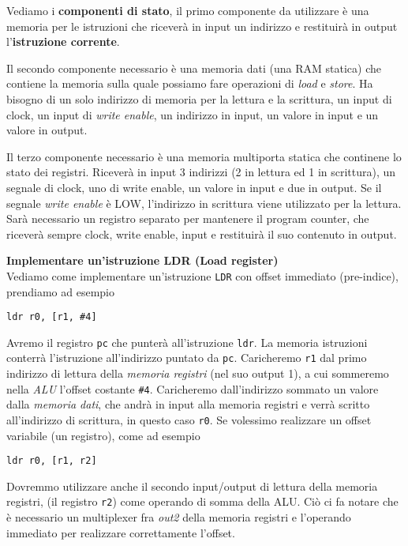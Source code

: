 Vediamo i \textbf{componenti di stato}, il primo componente da utilizzare è una memoria per le istruzioni che riceverà in input
un indirizzo e restituirà in output l'\textbf{istruzione corrente}.

Il secondo componente necessario è una memoria dati (una RAM statica) che contiene la memoria sulla quale possiamo fare operazioni di \textit{load} e \textit{store}.
Ha bisogno di un solo indirizzo di memoria per la lettura e la scrittura, un input di clock, un input di \textit{write enable}, un indirizzo in input, un valore in input e un valore in output.

Il terzo componente necessario è una memoria multiporta statica che continene lo stato dei registri.
Riceverà in input 3 indirizzi (2 in lettura ed 1 in scrittura), un segnale di clock, uno di write enable, un valore in input e due in output.
Se il segnale \textit{write enable} è LOW, l'indirizzo in scrittura viene utilizzato per la lettura.
Sarà necessario un registro separato per mantenere il program counter, che riceverà sempre clock, write enable, input e restituirà il suo contenuto in output.


\begin{defn}
\textbf{Implementare un'istruzione LDR (Load register)} \\
Vediamo come implementare un'istruzione \verb|LDR| con offset immediato (pre-indice), prendiamo ad esempio
\begin{lstlisting}[style=arm]
ldr r0, [r1, #4]
\end{lstlisting}
Avremo il registro \verb|pc| che punterà all'istruzione \verb|ldr|. La memoria istruzioni conterrà l'istruzione all'indirizzo puntato da \verb|pc|.
Caricheremo \verb|r1| dal primo indirizzo di lettura della \textit{memoria registri} (nel suo output 1), a cui sommeremo  nella \textit{ALU} l'offset costante \verb|#4|.
Caricheremo dall'indirizzo sommato un valore dalla \textit{memoria dati}, che andrà in input alla memoria registri e verrà scritto all'indirizzo di scrittura,
in questo caso \verb|r0|.
Se volessimo realizzare un offset variabile (un registro), come ad esempio
\begin{lstlisting}[style=arm]
ldr r0, [r1, r2]
\end{lstlisting}
Dovremmo utilizzare anche il secondo input/output di lettura della memoria registri, (il registro \verb|r2|) come operando di somma della ALU.
Ciò ci fa notare che è necessario un multiplexer fra \textit{out2} della memoria registri e l'operando immediato per realizzare correttamente l'offset.
\end{defn}


